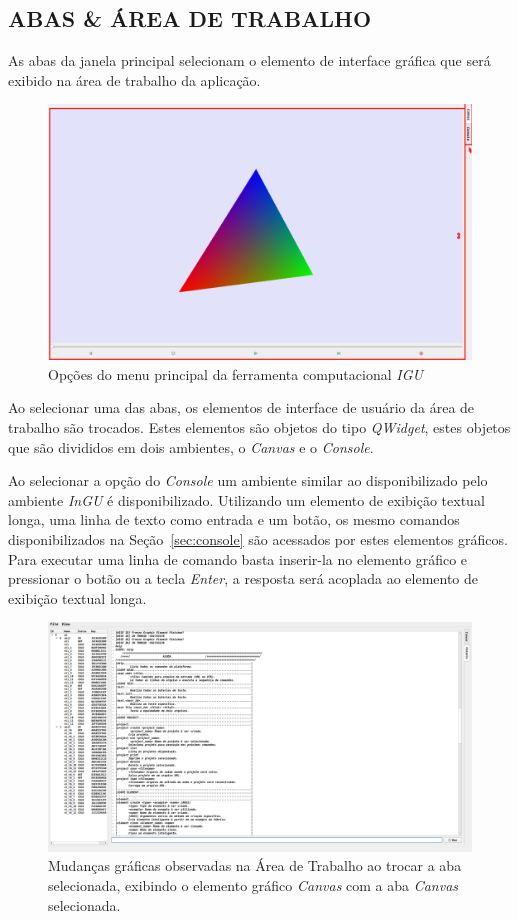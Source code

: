 \subsection{ABAS \& ÁREA DE TRABALHO}\label{sec:abas}

As abas da janela principal selecionam o elemento de interface gráfica que será exibido na área de trabalho da aplicação.

\begin{figure}[!htbp]
	\centering
	\includegraphics[width=\linewidth]{Figures/IGU_001a_34.png}
	\caption{Opções do menu principal da ferramenta computacional \textit{IGU}}
	\label{fig:abas}
\end{figure}

Ao selecionar uma das abas, os elementos de interface de usuário da área de trabalho são trocados. Estes elementos são objetos do tipo \textit{QWidget}, estes objetos que são divididos em dois ambientes, o \textit{Canvas} e o \textit{Console}. 

Ao selecionar a opção do \textit{Console} um ambiente similar ao disponibilizado pelo ambiente \textit{InGU} é disponibilizado. Utilizando um elemento de exibição textual longa, uma linha de texto como entrada e um botão, os mesmo comandos disponibilizados na Seção~\ref{sec:console} são acessados por estes elementos gráficos. Para executar uma linha de comando basta inserir-la no elemento gráfico e pressionar o botão ou a tecla \textit{Enter}, a resposta será acoplada ao elemento de exibição textual longa.

\begin{figure}
	\centering
	\includegraphics[width=.9\linewidth]{Figures/IGU_017.png}
	\caption{Mudanças gráficas observadas na Área de Trabalho ao trocar a aba selecionada, exibindo o elemento gráfico \textit{Canvas} com a aba \textit{Canvas} selecionada.}
	\label{fig:sfig1}
\end{figure}


